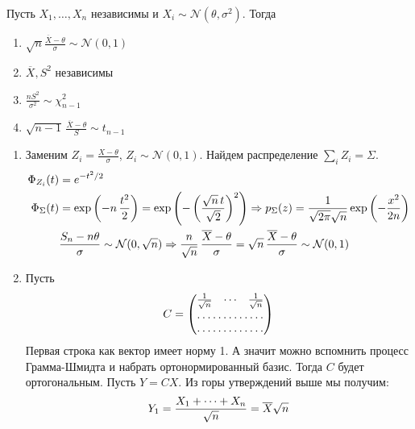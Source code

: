 \documentclass[12pt,timbord]{../../../notes}
\begin{document}
\begin{lem}[Фишера]\label{lem:stat::fishlem::fishlem}
  Пусть $X_1, \dotsc, X_n$ независимы и $X_i \sim \mathcal N (\theta,\sigma^2)$. Тогда
  \begin{enumerate}
    \item 
      $\displaystyle\sqrt n \frac{\overline X - \theta}{\sigma} \sim \mathcal N(0,1)$
    \item $\overline{X}, S^2$ независимы 
    \item $\displaystyle \frac{n S^2}{\sigma^2} \sim \chi_{n-1}^2 $
    \item $\displaystyle \sqrt{n-1}\, \frac{\overline X - \theta }{S}  \sim t_{n-1}$
  \end{enumerate}
\end{lem}
\begin{ittproof}
  \begin{enumerate}
    \item Заменим $Z_i = \frac{X-\theta }{\sigma}$, $Z_i \sim \mathcal N(0,1)$.
      Найдем распределение $\sum_i Z_i= \Sigma$. 
      \begin{align*}
        \Phi_{Z_i} (t) &= e^{-t^2/2} \\
        \Phi_{\Sigma} (t) &= \exp \left( -n\,\frac{t^2}{2} \right) 
        = \exp \left( -\left(\frac{\sqrt n\, t}{\sqrt 2} \right)^2\right)
        \Rightarrow 
        p_{\Sigma}(z) = \frac{1}{\sqrt{2\pi}\sqrt n} \exp \left( -\frac{x^2}{2 n}\right)\\
        &\frac{S_n - n\theta}{\sigma} \sim \mathcal N (0, \sqrt n) \Rightarrow 
        \frac{n}{\sqrt n} \,  \frac{\overline{X} - \theta}{\sigma} = \sqrt n\,\frac{\overline{X} -\theta}{\sigma}
        \sim \mathcal N(0,1)
      \end{align*}
    \item Пусть
      \[
        C = \begin{pmatrix}
          \frac{1}{\sqrt n} & \cdots & \frac{1}{\sqrt n} \\
          \hdotsfor{3} \\
          \hdotsfor{3}
        \end{pmatrix}
      \]
      Первая строка как вектор имеет норму 1. А значит можно вспомнить процесс Грамма-Шмидта и
      набрать ортонормированный базис. Тогда $C$ будет ортогональным. Пусть $Y = CX$. Из горы
      утверждений выше мы получим:
      \begin{align*}
        Y_1 &= \frac{X_1 + \dotsb + X_n}{\sqrt n} = \av X \sqrt n \\

\end{align*}
\end{enumerate}
\end{ittproof}
\end{document}
